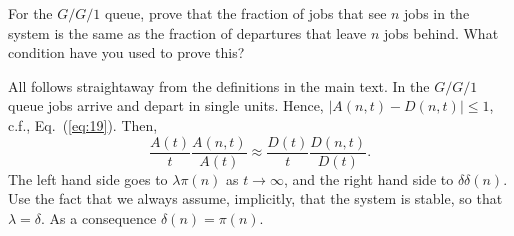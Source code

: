 \begin{exercise}
  For the $G/G/1$ queue, prove that the fraction of jobs that see $n$
  jobs in the system is the same as the fraction of departures that
  leave $n$ jobs behind. What condition have you used to prove this?
  \begin{solution}
    All follows straightaway from the definitions in the main text. In
    the $G/G/1$ queue jobs arrive and depart in single units. Hence,
    $|A(n,t)-D(n,t)|\leq 1$, c.f., Eq.~(\ref{eq:19}). Then, 
    \begin{equation*}
      \frac{A(t)}{t}\frac{A(n,t)}{A(t)} \approx 
      \frac{D(t)}{t}\frac{D(n,t)}{D(t)}. 
    \end{equation*}
    The left hand side goes to $\lambda \pi(n)$ as $t\to\infty$, and
    the right hand side to $\delta \delta(n)$. Use the fact that we
    always assume, implicitly, that the system is stable, so that
    $\lambda = \delta$. As a consequence $\delta(n) = \pi(n)$.
  \end{solution}
\end{exercise}

